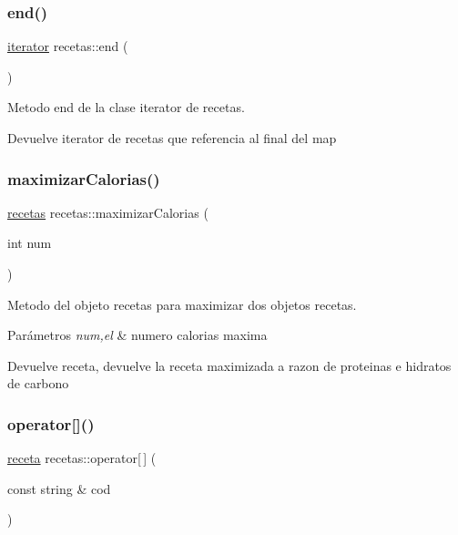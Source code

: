 \subsubsection{\texorpdfstring{end()}{end()}}
{\footnotesize\ttfamily \hyperlink{classrecetas_1_1iterator}{iterator} recetas\+::end (\begin{DoxyParamCaption}{ }\end{DoxyParamCaption})\hspace{0.3cm}{\ttfamily [inline]}}



Metodo end de la clase iterator de recetas. 

\begin{DoxyReturn}{Devuelve}
iterator de recetas que referencia al final del map 
\end{DoxyReturn}
\mbox{\label{classrecetas_a98a30fdaea9da3554bff98e9590e80e8}} 
\subsubsection{\texorpdfstring{maximizar\+Calorias()}{maximizarCalorias()}}
{\footnotesize\ttfamily \hyperlink{classrecetas}{recetas} recetas\+::maximizar\+Calorias (\begin{DoxyParamCaption}\item[{int}]{num }\end{DoxyParamCaption})}



Metodo del objeto recetas para maximizar dos objetos recetas. 


\begin{DoxyParams}{Parámetros}
{\em num,el} & numero calorias maxima \\
\hline
\end{DoxyParams}
\begin{DoxyReturn}{Devuelve}
receta, devuelve la receta maximizada a razon de proteinas e hidratos de carbono 
\end{DoxyReturn}
\mbox{\label{classrecetas_a4faf113ab37ebccbb2e72def72417aad}} 
\subsubsection{\texorpdfstring{operator[]()}{operator[]()}\hspace{0.1cm}{\footnotesize\ttfamily [1/2]}}
{\footnotesize\ttfamily \hyperlink{classreceta}{receta} recetas\+::operator\mbox{[}$\,$\mbox{]} (\begin{DoxyParamCaption}\item[{const string \&}]{cod }\end{DoxyParamCaption})}



